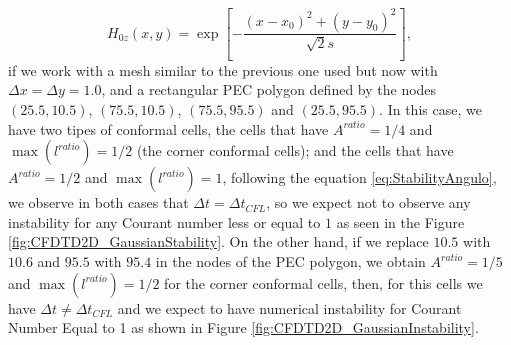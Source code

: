 \documentclass[12pt, oneside]{book}
\begin{document}
\begin{equation}
    H_{0z}(x,y) = \exp \left[ - \dfrac{(x - x_0)^2 + (y - y_0)^2}{\sqrt{2} s} \right],
\label{eq:Gaussian2DInitialCondition}
\end{equation}
if we work with a mesh similar to the previous one used but now with $\Delta x = \Delta y = 1.0$, and a rectangular PEC polygon defined by the nodes $(25.5,10.5)$, $(75.5,10.5)$, $(75.5, 95.5)$ and $(25.5, 95.5)$. In this case, we have two tipes of conformal cells, the cells that have $A^{ratio} = 1/4$ and $\max({l^{ratio}}) = 1/2$ (the corner conformal cells); and the cells that have $A^{ratio} = 1/2$ and $\max({l^{ratio}}) = 1$, following the equation \ref{eq:StabilityAngulo}, we observe in both cases that $\Delta t = \Delta t_{CFL}$, so we expect not to observe any instability for any Courant number less or equal to $1$ as seen in the Figure \ref{fig:CFDTD2D_GaussianStability}. On the other hand, if we replace $10.5$ with $10.6$ and $95.5$ with $95.4$ in the nodes of the PEC polygon, we obtain $A^{ratio} = 1/5$ and $\max({l^{ratio}}) = 1/2$ for the corner conformal cells, then, for this cells we have $\Delta t \neq \Delta t_{CFL}$ and we expect to have numerical instability for Courant Number Equal to 1 as shown in Figure \ref{fig:CFDTD2D_GaussianInstability}.
\end{document}

